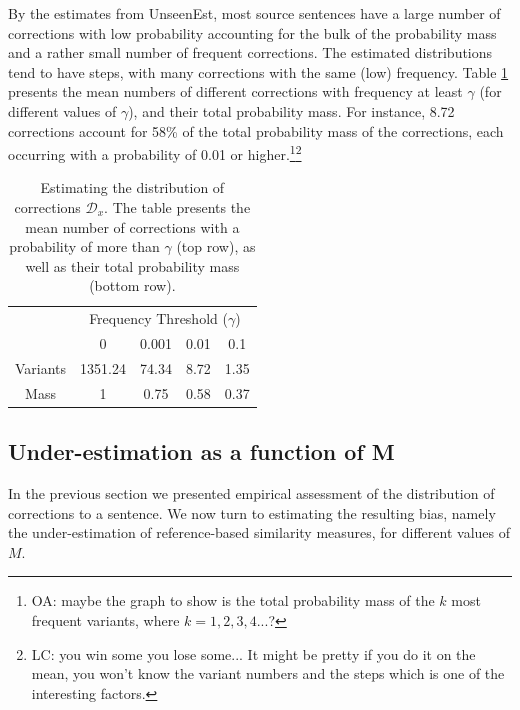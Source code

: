 \documentclass[letter,11pt]{article}
\newcommand{\oa}[1]{\footnote{\color{red}OA: #1}}
\newcommand{\lc}[1]{\footnote{\color{blue}LC: #1}}
\begin{document}
By the estimates from {\sc UnseenEst}, most source sentences have a large number of
corrections with low probability accounting for the bulk of the probability mass
and a rather small number of frequent corrections.
The estimated distributions tend to have steps, with many corrections with the same (low) frequency.
Table \ref{tab:corrections_dist} presents the mean numbers of different corrections with frequency at least
$\gamma$ (for different values of $\gamma$), and their total probability mass.
For instance, 8.72 corrections account for 58\% of the total probability mass of the corrections, each
occurring with a probability of 0.01 or higher.\oa{maybe the graph to show is the total probability mass
  of the $k$ most frequent variants, where $k=1,2,3,4...$?  }\lc{you win some you lose some... It might be pretty if you do it on the mean, you won't know the variant numbers and the steps which is one of the interesting factors.}

\begin{table}[h!]
  \centering
  \small
  \singlespacing
  \begin{tabular}{c|c|c|c|c|}
    & \multicolumn{4}{c|}{Frequency Threshold ($\gamma$)}\\ 
    & \multicolumn{1}{c}{0} & \multicolumn{1}{c}{0.001} & \multicolumn{1}{c}{0.01} & \multicolumn{1}{c|}{0.1}
    \\
    \hline
    Variants & 1351.24 & 74.34 & 8.72 & 1.35
    \\
    Mass & 1 & 0.75 & 0.58 & 0.37\\
    \hline
  \end{tabular}
  \caption{\label{tab:corrections_dist}
    Estimating the distribution of corrections $\mathcal{D}_x$.
    The table presents the mean number of corrections with a probability of more than
    $\gamma$ (top row), as well as their total probability mass (bottom row).
  }
\end{table}


\subsection{Under-estimation as a function of M} \label{subsec:Assessment-values}

In the previous section we presented empirical assessment of the distribution of
corrections to a sentence. We now turn to estimating the resulting bias, namely
the under-estimation of reference-based similarity measures, for different values of $M$. 
\end{document}
